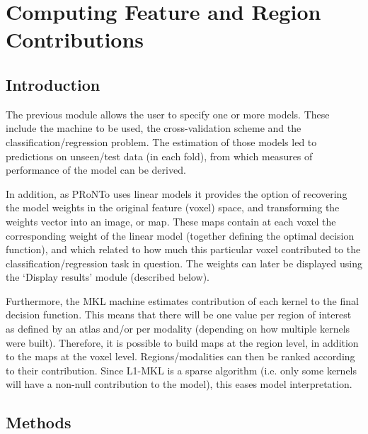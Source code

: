 
\chapter{Computing Feature and Region Contributions}
\label{chap:ComputeWeights}

\minitoc

\section{Introduction}

The previous module allows the user to specify one or more models. These include the machine to be used, the cross-validation scheme and the classification/regression problem. The estimation of those models led to predictions on unseen/test data (in each fold), from which measures of performance of the model can be derived.

In addition, as PRoNTo uses linear models it provides the option of recovering the model weights in the original feature (voxel) space, and transforming the weights vector into an image, or map. These maps contain at each voxel the corresponding weight of the linear model (together defining the optimal decision function), and which related to how much this particular voxel contributed to the classification/regression task in question. The weights can later be displayed using the `Display results' module (described below).

Furthermore, the MKL machine estimates contribution of each kernel to the final decision function. This means that there will
be one value per region of interest as defined by an atlas and/or per modality (depending on how multiple kernels were built).
Therefore, it is possible to build maps at the region level, in addition to the maps at the voxel level. Regions/modalities
can then be ranked according to their contribution. Since L1-MKL is a sparse algorithm (i.e. only some kernels will have a non-null contribution to the model), this eases model interpretation.

\section{Methods}


